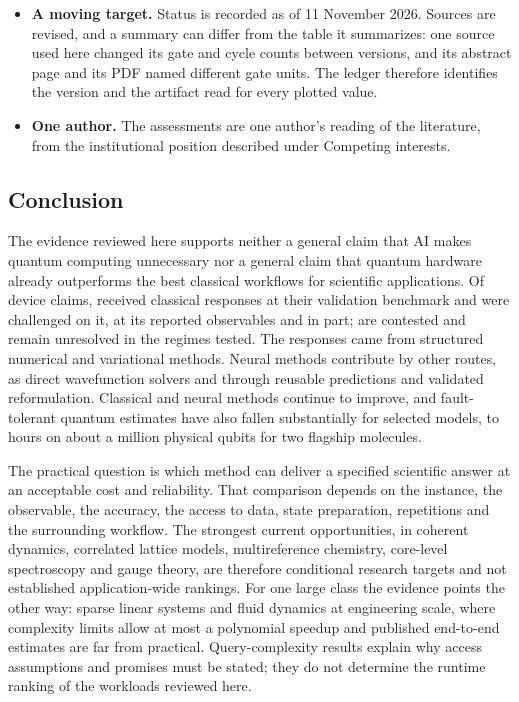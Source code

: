 \begin{itemize}
\item \textbf{A moving target.} Status is recorded as of 11 November 2026. Sources are revised, and a summary can differ from the table it summarizes: one source used here changed its gate and cycle counts between versions, and its abstract page and its PDF named different gate units. The ledger therefore identifies the version and the artifact read for every plotted value.
\item \textbf{One author.} The assessments are one author's reading of the literature, from the institutional position described under Competing interests.
\end{itemize}

\subsection{Conclusion}
\label{sec:conclusion}
The evidence reviewed here supports neither a general claim that AI makes quantum computing unnecessary nor a general claim that quantum hardware already outperforms the best classical workflows for scientific applications. Of \wTimeline{} device claims, \wTLvalidation{} received classical responses at their validation benchmark and \wTLchallenged{} were challenged on it, \wTLobservables{} at its reported observables and \wTLpartial{} in part; \wTLcontested{} are contested and \wTLopen{} remain unresolved in the regimes tested. The responses came from structured numerical and variational methods. Neural methods contribute by other routes, as direct wavefunction solvers and through reusable predictions and validated reformulation. Classical and neural methods continue to improve, and fault-tolerant quantum estimates have also fallen substantially for selected models, to hours on about a million physical qubits for two flagship molecules.

The practical question is which method can deliver a specified scientific answer at an acceptable cost and reliability. That comparison depends on the instance, the observable, the accuracy, the access to data, state preparation, repetitions and the surrounding workflow. The strongest current opportunities, in coherent dynamics, correlated lattice models, multireference chemistry, core-level spectroscopy and gauge theory, are therefore conditional research targets and not established application-wide rankings. For one large class the evidence points the other way: sparse linear systems and fluid dynamics at engineering scale, where complexity limits allow at most a polynomial speedup and published end-to-end estimates are far from practical. Query-complexity results explain why access assumptions and promises must be stated; they do not determine the runtime ranking of the workloads reviewed here.

